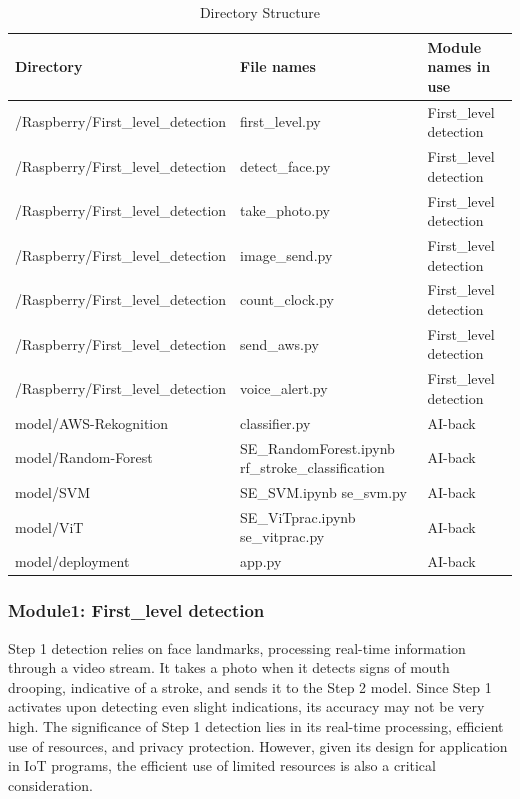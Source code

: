 \begin{table}[h]
\caption{Directory Structure}
\begin{tabular}{|p{4cm}|p{3cm}|p{2cm}|}
\hline
Directory & File names & Module names in use \\ \hline
/Raspberry/First\_level\_detection & first\_level.py & First\_level detection \\ \hline
/Raspberry/First\_level\_detection & detect\_face.py & First\_level detection\\ \hline
/Raspberry/First\_level\_detection & take\_photo.py & First\_level detection\\ \hline
/Raspberry/First\_level\_detection & image\_send.py & First\_level detection\\ \hline
/Raspberry/First\_level\_detection & count\_clock.py & First\_level detection\\ \hline
/Raspberry/First\_level\_detection & send\_aws.py & First\_level detection\\ \hline
/Raspberry/First\_level\_detection & voice\_alert.py & First\_level detection\\ \hline
model/AWS-Rekognition   &    classifier.py        &      AI-back  \\ \hline
model/Random-Forest   &  SE\_RandomForest.ipynb rf\_stroke\_classification       &   AI-back   \\ \hline
model/SVM   &     SE\_SVM.ipynb se\_svm.py      &          AI-back        \\ \hline
model/ViT   &      SE\_ViTprac.ipynb \newline se\_vitprac.py     &          AI-back \\ \hline
model/deployment & app.py & AI-back \\ \hline
\end{tabular}
\end{table}

\subsubsection{Module1: First\_level detection}
Step 1 detection relies on face landmarks, processing real-time information through a video stream. It takes a photo when it detects signs of mouth drooping, indicative of a stroke, and sends it to the Step 2 model. Since Step 1 activates upon detecting even slight indications, its accuracy may not be very high. The significance of Step 1 detection lies in its real-time processing, efficient use of resources, and privacy protection. However, given its design for application in IoT programs, the efficient use of limited resources is also a critical consideration.\\


